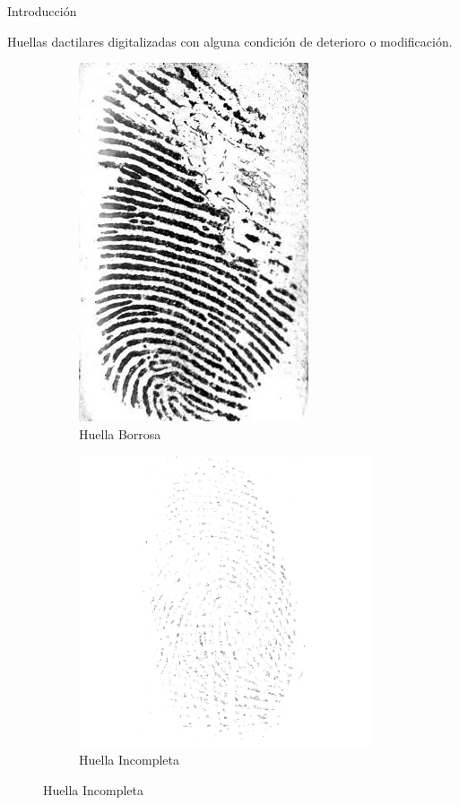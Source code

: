 \documentclass[12pt]{beamer}
\begin{document}
\begin{frame}{Introducción}

    Huellas dactilares digitalizadas con alguna condición de deterioro o modificación.
    \vspace{5mm}

    \begin{figure}[h]
        \begin{subfigure}{0.45\textwidth}
            \centering
            \includegraphics[scale=0.4]{figs/deteriorada_1.jpg}  
            \caption{Huella Borrosa}
        \end{subfigure}
        \begin{subfigure}{0.45\textwidth}
            \centering
            \includegraphics[scale=0.42]{figs/deteriorada_0.png}  
            \caption{Huella Incompleta}
        \end{subfigure}
    \end{figure}

\end{frame}
\end{document}
